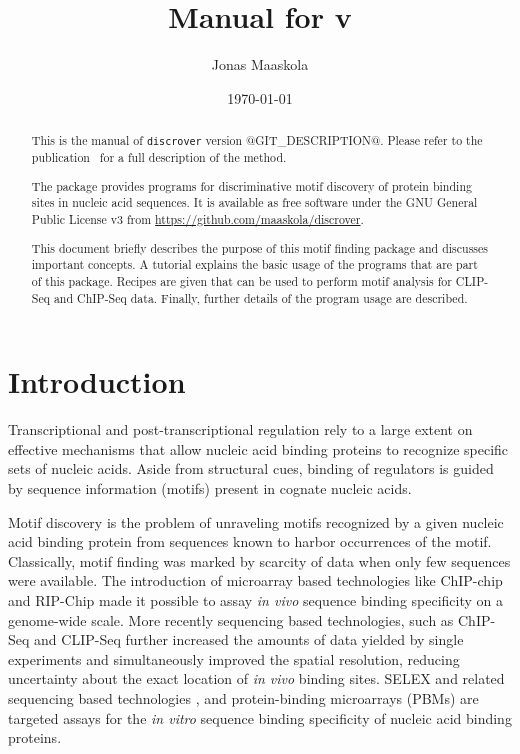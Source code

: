 \documentclass[a4paper]{article}
\title{Manual for \discrover{} v\version{}}
\author{Jonas Maaskola}
\date{\today}
\makeatletter
\newcommand{\discrover}[0]{\texttt{discrover}}
\newcommand{\version}[0]{@GIT_DESCRIPTION@}
\newcommand{\theurl}[0]{\url{https://github.com/maaskola/discrover}}
\makeatother
\begin{document}
\maketitle

\begin{abstract}
  This is the manual of \discrover{} version \version{}.
  Please refer to the publication~\cite{Maaskola2014} for a full description of the method.

  The package provides programs for discriminative motif discovery of protein binding sites in nucleic acid sequences.
  It is available as free software under the GNU General Public License v3 from \theurl{}.

  This document briefly describes the purpose of this motif finding package and discusses important concepts.
  A tutorial explains the basic usage of the programs that are part of this package.
  Recipes are given that can be used to perform motif analysis for CLIP-Seq and ChIP-Seq data.
  Finally, further details of the program usage are described.
\end{abstract}

\tableofcontents

\section{Introduction}

Transcriptional and post-transcriptional regulation rely to a large extent on effective mechanisms that allow nucleic acid binding proteins to recognize specific sets of nucleic acids.
Aside from structural cues, binding of regulators is guided by sequence information (motifs) present in cognate nucleic acids.

Motif discovery is the problem of unraveling motifs recognized by a given nucleic acid binding protein from sequences known to harbor occurrences of the motif.
Classically, motif finding was marked by scarcity of data when only few sequences were available.
The introduction of microarray based technologies like ChIP-chip \cite{Ren2000,Iyer2001} and RIP-Chip \cite{Tenenbaum2000,Keene2006} made it possible to assay \textit{in vivo} sequence binding specificity on a genome-wide scale.
More recently sequencing based technologies, such as ChIP-Seq \cite{Robertson2007, Johnson2007} and CLIP-Seq \cite{Licatalosi2008,Sanford2009,Hafner2010} further increased the amounts of data yielded by single experiments and simultaneously improved the spatial resolution, reducing uncertainty about the exact location of \textit{in vivo} binding sites.
SELEX \cite{Ellington1990,Tuerk1990} and related sequencing based technologies \cite{Jolma2010}, and protein-binding microarrays (PBMs) \cite{Bulyk2001,Berger2006a} are targeted assays for the \textit{in vitro} sequence binding specificity of nucleic acid binding proteins.
\end{document}

